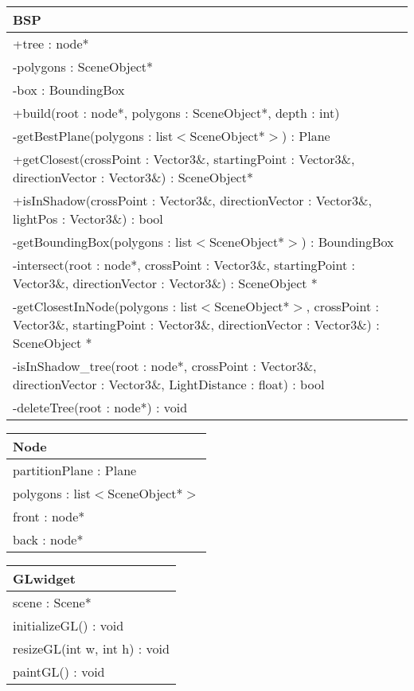 \begin{center}
    \begin{tabular}{|l|}
    \hline
    BSP \\ \hline
    +tree : node* \\
    -polygons : SceneObject* \\
    -box : BoundingBox \\ 
	\hline
	+build(root : node*, polygons : SceneObject*, depth : int) \\ 
	-getBestPlane(polygons : list$<$SceneObject*$>$) : Plane \\
	+getClosest(crossPoint : Vector3\&, startingPoint : Vector3\&, directionVector : Vector3\&) : SceneObject* \\
	+isInShadow(crossPoint : Vector3\&, directionVector : Vector3\&, lightPos : Vector3\&) : bool \\
	-getBoundingBox(polygons : list$<$SceneObject*$>$) : BoundingBox \\
	-intersect(root : node*, crossPoint : Vector3\&, startingPoint : Vector3\&, directionVector : Vector3\&) : SceneObject * \\
	-getClosestInNode(polygons : list$<$SceneObject*$>$, crossPoint : Vector3\&, startingPoint : Vector3\&, directionVector : Vector3\&) : SceneObject * \\
	-isInShadow\_tree(root : node*, crossPoint : Vector3\&, directionVector : Vector3\&, LightDistance : float) : bool \\
	-deleteTree(root : node*) : void \\
	\hline
    \end{tabular}
\end{center}

\begin{center}
    \begin{tabular}{|l|}
    \hline
    Node \\ \hline
    partitionPlane : Plane \\
    polygons : list$<$SceneObject*$>$ \\
    front : node*  \\
    back : node*  \\ \hline
    \end{tabular}
\end{center}


\begin{center}
    \begin{tabular}{|l|}
    \hline
    GLwidget \\ \hline
    scene : Scene*  \\ \hline
    initializeGL() : void \\ 
    resizeGL(int w, int h) : void \\
    paintGL() : void \\ \hline
    \end{tabular}
\end{center}

